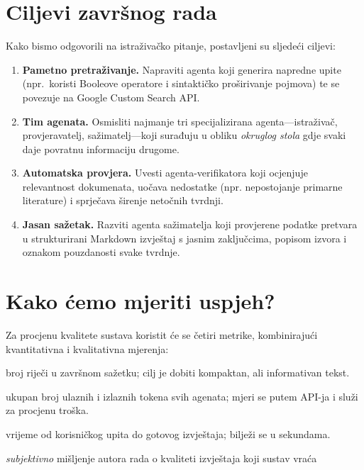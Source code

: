 \documentclass[zavrsnirad]{fer}
\begin{document}
\section{Ciljevi završnog rada}
\label{sec:goals}

Kako bismo odgovorili na istraživačko pitanje, postavljeni su sljedeći ciljevi:

\begin{enumerate}[label=\textbf{C\arabic*.}]
  \item \textbf{Pametno pretraživanje.} Napraviti agenta koji generira napredne upite (npr.\ koristi Booleove operatore i sintaktičko proširivanje pojmova) te se povezuje na Google Custom Search API.
  \item \textbf{Tim agenata.} Osmisliti najmanje tri specijalizirana agenta—istraživač, provjeravatelj, sažimatelj—koji surađuju u obliku \emph{okruglog stola} gdje svaki daje povratnu informaciju drugome.
  \item \textbf{Automatska provjera.} Uvesti agenta-verifikatora koji ocjenjuje relevantnost dokumenata, uočava nedostatke (npr. nepostojanje primarne literature) i sprječava širenje netočnih tvrdnji.
  \item \textbf{Jasan sažetak.} Razviti agenta sažimatelja koji provjerene podatke pretvara u strukturirani Markdown izvještaj s jasnim zaključcima, popisom izvora i oznakom pouzdanosti svake tvrdnje.
\end{enumerate}


\section{Kako ćemo mjeriti uspjeh?}
\label{sec:criteria}

Za procjenu kvalitete sustava koristit će se četiri metrike, kombinirajući kvantitativna i kvalitativna mjerenja:

\begin{description}[labelwidth=4.5cm, font=\normalfont\itshape, leftmargin=4.5cm]
  \item[Duljina izvještaja] broj riječi u završnom sažetku; cilj je dobiti kompaktan, ali informativan tekst.
  \item[Broj tokena] ukupan broj ulaznih i izlaznih tokena svih agenata; mjeri se putem API-ja i služi za procjenu troška.
  \item[Brzina izvršavanja] vrijeme od korisničkog upita do gotovog izvještaja; bilježi se u sekundama.
  \item[Kvaliteta odgovora] \emph{subjektivno} mišljenje autora rada o kvaliteti izvještaja koji sustav vraća
\end{description}
\end{document}
